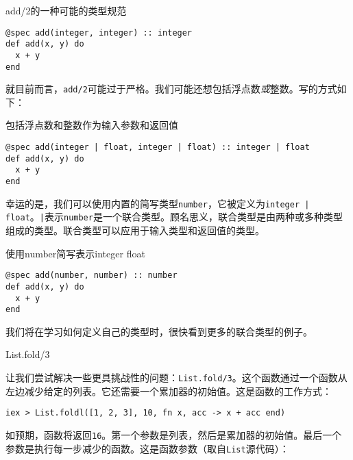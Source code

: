 \begin{code}{add/2的一种可能的类型规范}

\begin{verbatim}
@spec add(integer, integer) :: integer
def add(x, y) do
  x + y
end
\end{verbatim}
\end{code}

就目前而言，\texttt{add/2}可能过于严格。我们可能还想包括浮点数\emph{或}整数。写的方式如下：

\begin{code}{包括浮点数和整数作为输入参数和返回值}

\begin{verbatim}
@spec add(integer | float, integer | float) :: integer | float
def add(x, y) do
  x + y
end
\end{verbatim}
\end{code}

幸运的是，我们可以使用内置的简写类型\texttt{number}，它被定义为\texttt{integer | float}。\texttt{|}表示\texttt{number}是一个联合类型。顾名思义，联合类型是由两种或多种类型组成的类型。联合类型可以应用于输入类型和返回值的类型。

\begin{code}{使用number简写表示integer \textbar{} float}

\begin{verbatim}
@spec add(number, number) :: number
def add(x, y) do
  x + y
end
\end{verbatim}
\end{code}

我们将在学习如何定义自己的类型时，很快看到更多的联合类型的例子。

\begin{example}{List.fold/3}
\end{example}

让我们尝试解决一些更具挑战性的问题：\texttt{List.fold/3}。这个函数通过一个函数从左边减少给定的列表。它还需要一个累加器的初始值。这是函数的工作方式：

\begin{code}{}
\begin{verbatim}
iex > List.foldl([1, 2, 3], 10, fn x, acc -> x + acc end)
\end{verbatim}
\end{code}

如预期，函数将返回\texttt{16}。第一个参数是列表，然后是累加器的初始值。最后一个参数是执行每一步减少的函数。这是函数参数（取自\texttt{List}源代码）：

